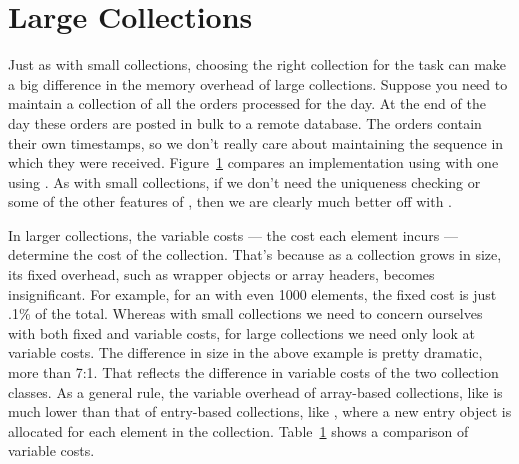 





\section{Large Collections}

Just as with small collections, choosing the right collection for the task
can make a big difference in the memory overhead of large collections.  Suppose
you need to maintain a collection of all the orders processed for the day.  At
the end of the day these orders are posted in bulk to a remote database. The orders
contain their own timestamps, so we don't really care about maintaining the
sequence in which they were received. Figure~\ref{} compares an implementation
using  with one using . As with small
collections, if we don't need the uniqueness checking or some of the other features of , 
then we are clearly much better off with .

In larger collections, the variable costs --- the cost each
element incurs --- determine the cost of the collection. That's because as a
collection grows in size, its fixed overhead, such as wrapper objects or array headers, becomes insignificant.  For
example, for an  with even 1000 elements, the fixed cost is
just .1\% of the total.  Whereas with small collections we need to concern
ourselves with both fixed and variable costs, for large collections we
need only look at variable costs. The difference in size in the above example
is pretty dramatic, more than 7:1. That reflects the difference in variable costs of the two collection classes. 
As a general rule, the variable overhead of array-based collections, like
 is much lower than that of entry-based collections, like , where a new entry
object is allocated for each element in the collection. Table~\ref{} shows a
comparison of variable costs.


